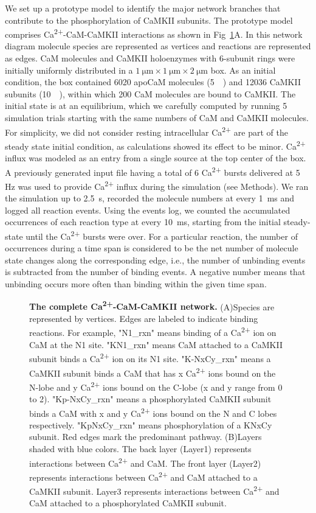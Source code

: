 \documentclass[10pt,letterpaper]{article}
\begin{document}
We set up a prototype model to identify the major network branches that contribute to the phosphorylation of CaMKII subunits. The prototype model comprises Ca\textsuperscript{2+}-CaM-CaMKII interactions as shown in Fig~\ref{fig2}A. In this network diagram molecule species are represented as vertices and reactions are represented as edges. CaM molecules and CaMKII holoenzymes with 6-subunit rings were initially uniformly distributed in a $\SI{1}{\um}\times\SI{1}{\um}\times\SI{2}{\um}$ box. As an initial condition, the box contained 6020 apoCaM molecules (\SI{5}{\micro\Molar}) and 12036 CaMKII subunits (\SI{10}{\micro\Molar}), within which 200 CaM molecules are bound to CaMKII. The initial state is at an equilibrium, which we carefully computed by running 5 simulation trials starting with the same numbers of CaM and CaMKII molecules. For simplicity, we did not consider resting intracellular Ca\textsuperscript{2+} are part of the steady state initial condition, as calculations showed its effect to be minor. Ca\textsuperscript{2+} influx was modeled as an entry from a single source at the top center of the box. A previously generated input file having a total of 6 Ca\textsuperscript{2+} bursts delivered at 5 Hz was used to provide Ca\textsuperscript{2+} influx during the simulation (see Methods). We ran the simulation up to \SI{2.5}{\s}, recorded the molecule numbers at every \SI{1}{\ms} and logged all reaction events. Using the events log, we counted the accumulated occurrences of each reaction type at every \SI{10}{\ms}, starting from the initial steady-state until the Ca\textsuperscript{2+} bursts were over. For a particular reaction, the number of occurrences during a time span is considered to be the net number of molecule state changes along the corresponding edge, i.e., the number of unbinding events is subtracted from the number of binding events. A negative number means that unbinding occurs more often than binding within the given time span. 

\begin{figure}[!h]
	\caption{{\bf The complete Ca\textsuperscript{2+}-CaM-CaMKII network.}
	(A)Species are represented by vertices. Edges are labeled to indicate binding reactions. For example, "N1\_rxn" means binding of a Ca\textsuperscript{2+} ion on CaM at the N1 site. "KN1\_rxn" means CaM attached to a CaMKII subunit binds a Ca\textsuperscript{2+} ion on its N1 site. "K-NxCy\_rxn" means a CaMKII subunit binds a CaM that has x Ca\textsuperscript{2+} ions bound on the N-lobe and y Ca\textsuperscript{2+} ions bound on the C-lobe (x and y range from 0 to 2). "Kp-NxCy\_rxn" means a phosphorylated CaMKII subunit binds a CaM with x and y Ca\textsuperscript{2+} ions bound on the N and C lobes respectively. "KpNxCy\_rxn" means phosphorylation of a KNxCy subunit. Red edges mark the predominant pathway. 
	(B)Layers shaded with blue colors. The back layer (Layer1) represents interactions between Ca\textsuperscript{2+} and CaM. The front layer (Layer2) represents interactions between Ca\textsuperscript{2+} and CaM attached to a CaMKII subunit. Layer3 represents interactions between Ca\textsuperscript{2+} and CaM attached to a phosphorylated CaMKII subunit.
	}
\label{fig2}
\end{figure}
\end{document}
